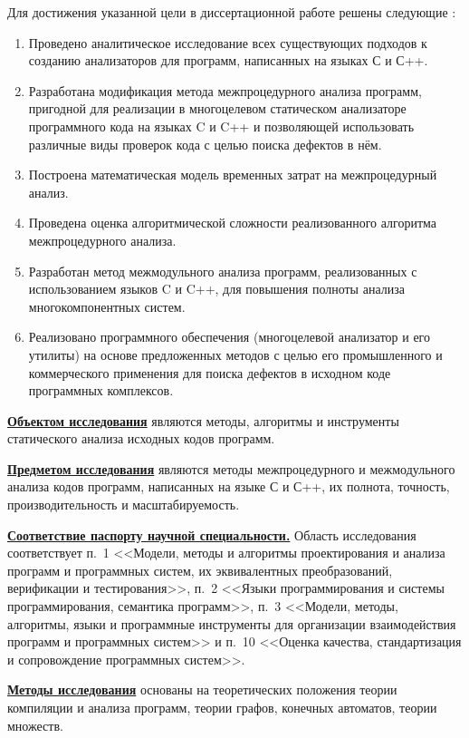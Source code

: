 Для достижения указанной цели в диссертационной работе решены следующие {\tasks}:
\begin{enumerate}[leftmargin=1em]
  \item Проведено аналитическое исследование всех существующих подходов к созданию анализаторов для программ, написанных на языках С и С++.
  \item Разработана модификация метода межпроцедурного анализа программ, пригодной для реализации в многоцелевом статическом анализаторе программного кода на языках C и C++ и позволяющей использовать различные виды проверок кода с целью поиска дефектов в нём.
  \item Построена математическая модель временных затрат на межпроцедурный анализ.
  \item Проведена оценка алгоритмической сложности реализованного алгоритма межпроцедурного анализа.
  \item Разработан метод межмодульного анализа программ, реализованных с использованием языков C и C++, для повышения полноты анализа многокомпонентных систем.
  \item Реализовано программного обеспечения (многоцелевой анализатор и его утилиты) на основе предложенных методов с целью его промышленного и коммерческого применения для поиска дефектов в исходном коде программных комплексов.
\end{enumerate}

\underline{\textbf{Объектом исследования}} являются методы, алгоритмы и инструменты статического анализа исходных кодов программ.

\underline{\textbf{Предметом исследования}} являются методы межпроцедурного и межмодульного анализа кодов программ, написанных на языке С и С++, их полнота, точность, производительность и масштабируемость.

\underline{\textbf{Соответствие паспорту научной специальности.}} Область исследования соответствует п.~1 <<Модели, методы и алгоритмы проектирования и анализа программ и программных систем, их эквивалентных преобразований, верификации и тестирования>>, п.~2 <<Языки программирования и системы программирования, семантика программ>>, п.~3 <<Модели, методы, алгоритмы, языки и программные инструменты для организации взаимодействия программ и программных систем>> и п.~10 <<Оценка качества, стандартизация и сопровождение программных систем>>.

\underline{\textbf{Методы исследования}} основаны на теоретических положения теории компиляции и анализа программ, теории графов, конечных автоматов, теории множеств.

